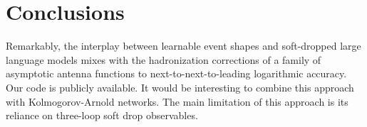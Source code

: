 \section{Conclusions}\label{sec:conclusions}

Remarkably, the interplay between learnable event shapes and
soft-dropped large language models mixes with the hadronization
corrections of a family of asymptotic antenna functions to
next-to-next-to-leading logarithmic accuracy. Our code is publicly
available. It would be interesting to combine this approach with
Kolmogorov-Arnold networks. The main limitation of this approach is its
reliance on three-loop soft drop observables.

